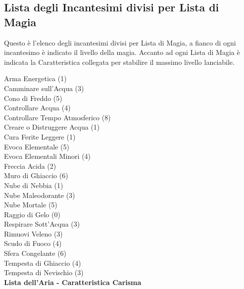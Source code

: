 \pagebreak



\subsection{Lista degli Incantesimi divisi per Lista di Magia}\hypertarget{elencoscuole}{}

{\small

Questo è l'elenco degli incantesimi divisi per Lista di Magia, a fianco di ogni incantesimo è indicato il livello della magia. Accanto ad ogni Lista di Magia è indicata la Caratteristica collegata per stabilire il massimo livello lanciabile. }

\begin{multicols}{3}

{\small

	\bigskip


	Arma Energetica (1)\\
	Camminare sull'Acqua (3)\\
	Cono di Freddo (5)\\
	Controllare Acqua (4)\\
	Controllare Tempo Atmosferico (8)\\
	Creare o Distruggere Acqua (1)\\
	Cura Ferite Leggere (1)\\
	Evoca Elementale (5)\\
	Evoca Elementali Minori (4)\\
	Freccia Acida (2)\\
	Muro di Ghiaccio (6)\\
	Nube di Nebbia (1)\\
	Nube Maleodorante (3)\\
	Nube Mortale (5)\\
	Raggio di Gelo (0)\\
	Respirare Sott'Acqua (3)\\
	Rimuovi Veleno (3)\\
	Scudo di Fuoco (4)\\
	Sfera Congelante (6)\\
	Tempesta di Ghiaccio (4)\\
	Tempesta di Nevischio (3)\\

	\medskip\textbf{Lista dell'Aria - Caratteristica Carisma}

}
\end{multicols}
